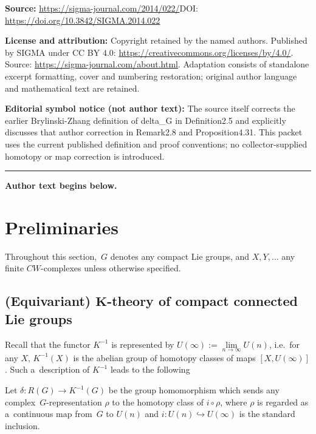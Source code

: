 \documentclass[11pt]{article}
\numberwithin{equation}{section}
\begin{document}
\noindent\textbf{Source:} \url{https://sigma-journal.com/2014/022/}\quad DOI: \url{https://doi.org/10.3842/SIGMA.2014.022}\par
\noindent\textbf{License and attribution:} Copyright retained by the named authors. Published by SIGMA under CC BY 4.0: \url{https://creativecommons.org/licenses/by/4.0/}. Source: \url{https://sigma-journal.com/about.html}. Adaptation consists of standalone excerpt formatting, cover and numbering restoration; original author language and mathematical text are retained.\par
\noindent\textbf{Editorial symbol notice (not author text):} The source itself corrects the earlier Brylinski-Zhang definition of delta\_G in Definition2.5 and explicitly discusses that author correction in Remark2.8 and Proposition4.31. This packet uses the current published definition and proof conventions; no collector-supplied homotopy or map correction is introduced.\par
\medskip\hrule\medskip\noindent\textbf{Author text begins below.}\par
\setcounter{section}{1}
\setcounter{subsection}{0}
\setcounter{subsubsection}{0}
\setcounter{Theorem}{0}
\setcounter{equation}{0}
\section{Preliminaries}\label{Section2}

Throughout this section,~$G$ denotes any compact Lie groups, and $X, Y, \dots$ any f\/inite $CW$-complexes unless
otherwise specif\/ied.

\vspace{-1mm}

\subsection[(Equivariant) $K$-theory of compact connected Lie groups]{(Equivariant)
$\boldsymbol{K}$-theory of compact connected Lie groups}

Recall that the functor $K^{-1}$ is represented by $U(\infty):=\lim\limits_{n\to\infty}U(n)$, i.e.\
for any $X$, $K^{-1}(X)$ is the abelian group of homotopy classes of maps $[X, U(\infty)]$.
Such a~description of $K^{-1}$ leads to the following
\begin{Definition}
\label{betamap}
Let $\delta: R(G)\to K^{-1}(G)$ be the group homomorphism which sends any complex~$G$-representation $\rho$ to the
homotopy class of $i\circ \rho$, where $\rho$ is regarded as a~continuous map from~$G$ to $U(n)$ and $i:
U(n)\hookrightarrow U(\infty)$ is the standard inclusion.
\end{Definition}
\end{document}
